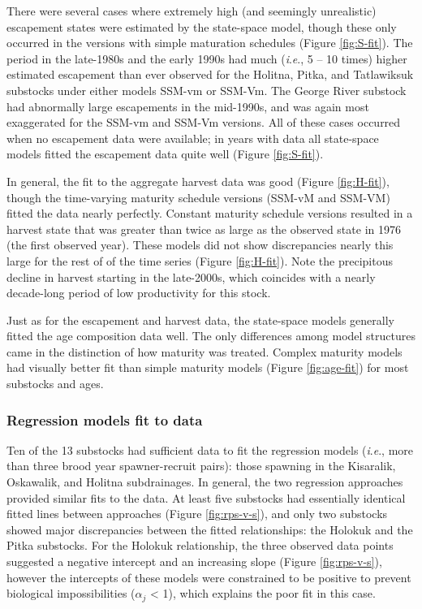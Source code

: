 \documentclass[12pt,]{book}
\theoremstyle{definition}
\theoremstyle{definition}
\theoremstyle{definition}
\theoremstyle{remark}
\begin{document}
There were several cases where extremely high (and seemingly
unrealistic) escapement states were estimated by the state-space model,
though these only occurred in the versions with simple maturation
schedules (Figure \ref{fig:S-fit}). The period in the late-1980s and the
early 1990s had much (\emph{i}.\emph{e}., 5 -- 10 times) higher
estimated escapement than ever observed for the Holitna, Pitka, and
Tatlawiksuk substocks under either models SSM-vm or SSM-Vm. The George
River substock had abnormally large escapements in the mid-1990s, and
was again most exaggerated for the SSM-vm and SSM-Vm versions. All of
these cases occurred when no escapement data were available; in years
with data all state-space models fitted the escapement data quite well
(Figure \ref{fig:S-fit}).

In general, the fit to the aggregate harvest data was good (Figure
\ref{fig:H-fit}), though the time-varying maturity schedule versions
(SSM-vM and SSM-VM) fitted the data nearly perfectly. Constant maturity
schedule versions resulted in a harvest state that was greater than
twice as large as the observed state in 1976 (the first observed year).
These models did not show discrepancies nearly this large for the rest
of of the time series (Figure \ref{fig:H-fit}). Note the precipitous
decline in harvest starting in the late-2000s, which coincides with a
nearly decade-long period of low productivity for this stock.

Just as for the escapement and harvest data, the state-space models
generally fitted the age composition data well. The only differences
among model structures came in the distinction of how maturity was
treated. Complex maturity models had visually better fit than simple
maturity models (Figure \ref{fig:age-fit}) for most substocks and ages.

\subsubsection{Regression models fit to data}\label{reg-fit}

\noindent
Ten of the 13 substocks had sufficient data to fit the regression models
(\emph{i}.\emph{e}., more than three brood year spawner-recruit pairs):
those spawning in the Kisaralik, Oskawalik, and Holitna subdrainages. In
general, the two regression approaches provided similar fits to the
data. At least five substocks had essentially identical fitted lines
between approaches (Figure \ref{fig:rps-v-s}), and only two substocks
showed major discrepancies between the fitted relationships: the Holokuk
and the Pitka substocks. For the Holokuk relationship, the three
observed data points suggested a negative intercept and an increasing
slope (Figure \ref{fig:rps-v-s}), however the intercepts of these models
were constrained to be positive to prevent biological impossibilities
(\(\alpha_j\) \textless{} 1), which explains the poor fit in this case.
\end{document}
